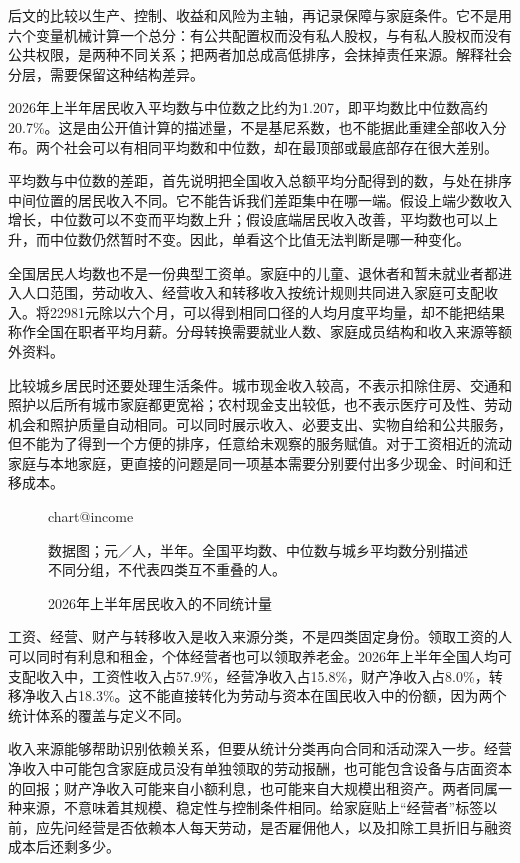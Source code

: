 \documentclass[UTF8,fontset=fandol,zihao=-4,oneside,openany]{ctexbook}
\makeatletter
\newcommand{\Chart}[3]{\begin{figure}[htbp]\centering\csname chart@#1\endcsname\caption{#2}\par\small #3\end{figure}}
\makeatother
\begin{document}
后文的比较以生产、控制、收益和风险为主轴，再记录保障与家庭条件。它不是用六个变量机械计算一个总分：有公共配置权而没有私人股权，与有私人股权而没有公共权限，是两种不同关系；把两者加总成高低排序，会抹掉责任来源。解释社会分层，需要保留这种结构差异。

2026年上半年居民收入平均数与中位数之比约为1.207，即平均数比中位数高约20.7\%。这是由公开值计算的描述量，不是基尼系数，也不能据此重建全部收入分布。两个社会可以有相同平均数和中位数，却在最顶部或最底部存在很大差别。\cite{Income2026}

\label{arg:P160}
平均数与中位数的差距，首先说明把全国收入总额平均分配得到的数，与处在排序中间位置的居民收入不同。它不能告诉我们差距集中在哪一端。假设上端少数收入增长，中位数可以不变而平均数上升；假设底端居民收入改善，平均数也可以上升，而中位数仍然暂时不变。因此，单看这个比值无法判断是哪一种变化。

全国居民人均数也不是一份典型工资单。家庭中的儿童、退休者和暂未就业者都进入人口范围，劳动收入、经营收入和转移收入按统计规则共同进入家庭可支配收入。将22981元除以六个月，可以得到相同口径的人均月度平均量，却不能把结果称作全国在职者平均月薪。分母转换需要就业人数、家庭成员结构和收入来源等额外资料。\cite{Income2026}

比较城乡居民时还要处理生活条件。城市现金收入较高，不表示扣除住房、交通和照护以后所有城市家庭都更宽裕；农村现金支出较低，也不表示医疗可及性、劳动机会和照护质量自动相同。可以同时展示收入、必要支出、实物自给和公共服务，但不能为了得到一个方便的排序，任意给未观察的服务赋值。对于工资相近的流动家庭与本地家庭，更直接的问题是同一项基本需要分别要付出多少现金、时间和迁移成本。

\Chart{income}{2026年上半年居民收入的不同统计量}{数据图；元／人，半年。全国平均数、中位数与城乡平均数分别描述不同分组，不代表四类互不重叠的人。\cite{Income2026}}

工资、经营、财产与转移收入是收入来源分类，不是四类固定身份。领取工资的人可以同时有利息和租金，个体经营者也可以领取养老金。2026年上半年全国人均可支配收入中，工资性收入占57.9\%，经营净收入占15.8\%，财产净收入占8.0\%，转移净收入占18.3\%。这不能直接转化为劳动与资本在国民收入中的份额，因为两个统计体系的覆盖与定义不同。\cite{Income2026}

\label{arg:P161}
收入来源能够帮助识别依赖关系，但要从统计分类再向合同和活动深入一步。经营净收入中可能包含家庭成员没有单独领取的劳动报酬，也可能包含设备与店面资本的回报；财产净收入可能来自小额利息，也可能来自大规模出租资产。两者同属一种来源，不意味着其规模、稳定性与控制条件相同。给家庭贴上“经营者”标签以前，应先问经营是否依赖本人每天劳动，是否雇佣他人，以及扣除工具折旧与融资成本后还剩多少。
\end{document}
